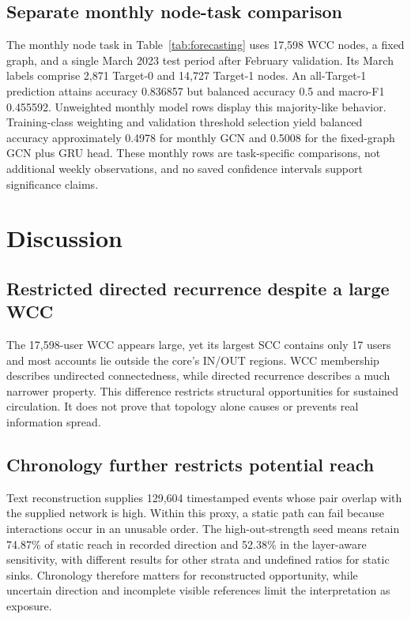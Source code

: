 \documentclass[11pt,a4paper]{article}
\begin{document}
\subsection{Separate monthly node-task comparison}
The monthly node task in Table~\ref{tab:forecasting} uses 17,598 WCC nodes, a fixed graph, and a single March 2023 test period after February validation. Its March labels comprise 2,871 Target-0 and 14,727 Target-1 nodes. An all-Target-1 prediction attains accuracy 0.836857 but balanced accuracy 0.5 and macro-F1 0.455592. Unweighted monthly model rows display this majority-like behavior. Training-class weighting and validation threshold selection yield balanced accuracy approximately 0.4978 for monthly GCN and 0.5008 for the fixed-graph GCN plus GRU head. These monthly rows are task-specific comparisons, not additional weekly observations, and no saved confidence intervals support significance claims.

\FloatBarrier

\section{Discussion}
\subsection{Restricted directed recurrence despite a large WCC}
The 17,598-user WCC appears large, yet its largest SCC contains only 17 users and most accounts lie outside the core's IN/OUT regions. WCC membership describes undirected connectedness, while directed recurrence describes a much narrower property. This difference restricts structural opportunities for sustained circulation. It does not prove that topology alone causes or prevents real information spread.

\subsection{Chronology further restricts potential reach}
Text reconstruction supplies 129,604 timestamped events whose pair overlap with the supplied network is high. Within this proxy, a static path can fail because interactions occur in an unusable order. The high-out-strength seed means retain 74.87\% of static reach in recorded direction and 52.38\% in the layer-aware sensitivity, with different results for other strata and undefined ratios for static sinks. Chronology therefore matters for reconstructed opportunity, while uncertain direction and incomplete visible references limit the interpretation as exposure.
\end{document}
